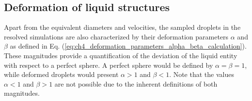 \subsection{Deformation of liquid structures}
\label{subsec:def_liquid_structures}

Apart from the equivalent diameters and velocities, the sampled droplets in the resolved simulations are also characterized by their deformation parameters $\alpha$ and $\beta$ as defined in Eq. (\ref{eq:ch4_deformation_parameters_alpha_beta_calculation}). These magnitudes provide a quantification of the deviation of the liquid entity with respect to a perfect sphere. A perfect sphere would be defined by $\alpha = \beta = 1$, while deformed droplets would present $\alpha > 1$ and $\beta < 1$. Note that the values $\alpha < 1$ and $\beta > 1$ are not possible due to the inherent definitions of both magnitudes.



%
%
%


